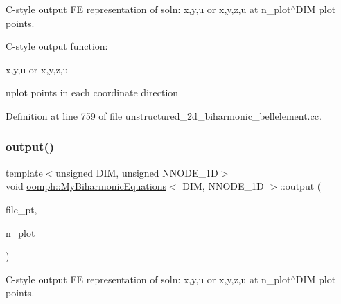 C-\/style output FE representation of soln\+: x,y,u or x,y,z,u at n\+\_\+plot$^\wedge$\+D\+IM plot points. 

C-\/style output function\+:

x,y,u or x,y,z,u

nplot points in each coordinate direction 

Definition at line 759 of file unstructured\+\_\+2d\+\_\+biharmonic\+\_\+bellelement.\+cc.

\mbox{\label{classoomph_1_1MyBiharmonicEquations_a898e272a1af66eacb3ebe5ac2fbe7749}} 
\subsubsection{\texorpdfstring{output()}{output()}\hspace{0.1cm}{\footnotesize\ttfamily [8/8]}}
{\footnotesize\ttfamily template$<$unsigned D\+IM, unsigned N\+N\+O\+D\+E\+\_\+1D$>$ \\
void \hyperlink{classoomph_1_1MyBiharmonicEquations}{oomph\+::\+My\+Biharmonic\+Equations}$<$ D\+IM, N\+N\+O\+D\+E\+\_\+1D $>$\+::output (\begin{DoxyParamCaption}\item[{F\+I\+LE $\ast$}]{file\+\_\+pt,  }\item[{const unsigned \&}]{n\+\_\+plot }\end{DoxyParamCaption})}



C-\/style output FE representation of soln\+: x,y,u or x,y,z,u at n\+\_\+plot$^\wedge$\+D\+IM plot points. 

\mbox{\label{classoomph_1_1MyBiharmonicEquations_a0f45f28eae4d25ddd9e53a769c3626a3}} 
